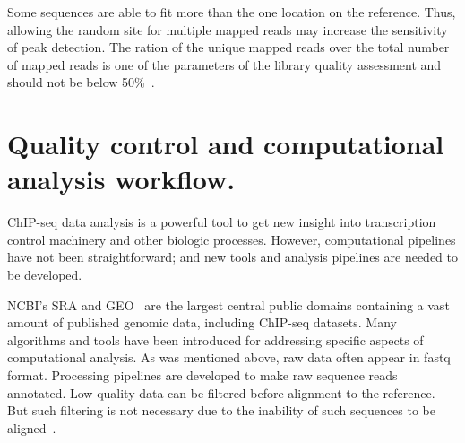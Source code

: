 Some sequences are able to fit more than the one location on the reference. Thus, allowing the random site for multiple mapped reads may increase the sensitivity of peak detection. 
The ration of the unique mapped reads over the total number of mapped reads is one of the parameters of the library quality assessment and should not be below 50\%~\cite{shin2013computational}.













\section{Quality control and computational analysis workflow.}


ChIP-seq data analysis is a powerful tool to get new insight into transcription control machinery and other biologic processes. 
However, computational pipelines have not been straightforward; 
and new tools and analysis pipelines are needed to be developed.

NCBI's SRA and GEO~\cite{barrett2012ncbi} are the largest central public domains containing a vast amount of published genomic data, including ChIP-seq datasets. 
Many algorithms and tools have been introduced for addressing specific aspects of computational analysis. 
As was mentioned above, raw data often appear in fastq format. 
Processing pipelines are developed to make raw sequence reads annotated.
Low-quality data can be filtered before alignment to the reference. 
But such filtering is not necessary due to the inability of such sequences to be aligned~\cite{furey2012chip}.


